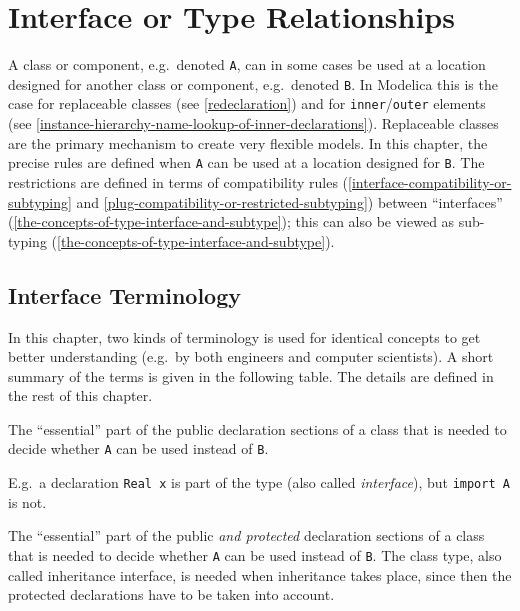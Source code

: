 \chapter{Interface or Type Relationships}\label{interface-or-type-relationships}

A class or component, e.g.\ denoted \lstinline!A!, can in some cases be used at a
location designed for another class or component, e.g.\ denoted \lstinline!B!. In
Modelica this is the case for replaceable classes (see \cref{redeclaration}) and
for \lstinline!inner!/\lstinline!outer! elements (see \cref{instance-hierarchy-name-lookup-of-inner-declarations}).
Replaceable classes are the
primary mechanism to create very flexible models. In this chapter, the
precise rules are defined when \lstinline!A! can be used at a location designed for
\lstinline!B!. The restrictions are defined in terms of compatibility rules
(\cref{interface-compatibility-or-subtyping} and \cref{plug-compatibility-or-restricted-subtyping}) between ``interfaces'' (\cref{the-concepts-of-type-interface-and-subtype}); this can
also be viewed as sub-typing (\cref{the-concepts-of-type-interface-and-subtype}).

\section{Interface Terminology}\label{interface-terminology}

In this chapter, two kinds of terminology is used for identical concepts to get better understanding (e.g.\ by both engineers and computer scientists).
A short summary of the terms is given in the following table.
The details are defined in the rest of this chapter.

\begin{definition}
The ``essential'' part of the public declaration sections of a class
that is needed to decide whether \lstinline!A! can be used instead of \lstinline!B!.
\par
\begin{nonnormative*}
E.g.\ a declaration \lstinline!Real x! is part of the type (also called \emph{interface}), but \lstinline!import A! is not.
\end{nonnormative*}
\end{definition}

\begin{definition}
The ``essential'' part of the public \emph{and protected} declaration sections of a class that is needed to decide whether \lstinline!A! can be used instead of \lstinline!B!. The class type, also
called inheritance interface, is needed when inheritance takes place, since then the protected declarations have to be taken into account.
\end{definition}

